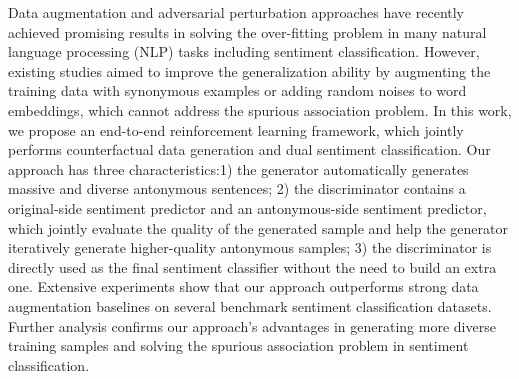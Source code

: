 Data augmentation and adversarial perturbation approaches have recently achieved promising results in solving the over-fitting problem in many natural language processing (NLP) tasks including sentiment classification. However, existing studies aimed to improve the generalization ability by augmenting the training data with synonymous examples or adding random noises to word embeddings, which cannot address the spurious association problem. In this work, we propose an end-to-end reinforcement learning framework, which jointly performs counterfactual data generation and dual sentiment classification. Our approach has three characteristics:1) the generator automatically generates massive and diverse antonymous sentences; 2) the discriminator contains a original-side sentiment predictor and an antonymous-side sentiment predictor, which jointly evaluate the quality of the generated sample and help the generator iteratively generate higher-quality antonymous samples; 3) the discriminator is directly used as the final sentiment classifier without the need to build an extra one. Extensive experiments show that our approach outperforms strong data augmentation baselines on several benchmark sentiment classification datasets. Further analysis confirms our approach's advantages in generating more diverse training samples and solving the spurious association problem in sentiment classification.
